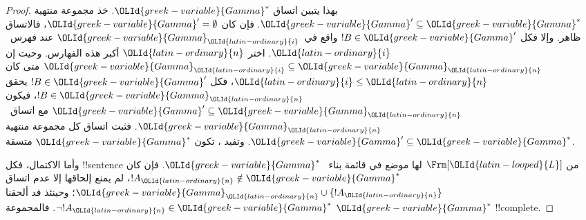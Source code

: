 \documentclass[../../../include/open-logic-section]{subfiles}
\begin{document}
\begin{proof}
بهذا يتبين اتساق ${\OLId{greek-variable}{Gamma}}^*$. خذ مجموعة منتهية
${\OLId{greek-variable}{Gamma}}' \subseteq {\OLId{greek-variable}{Gamma}}^*$. فإن كان ${\OLId{greek-variable}{Gamma}}'=\emptyset$، فالاتساق
ظاهر. وإلا فكل $!B \in {\OLId{greek-variable}{Gamma}}'$ واقع في~${\OLId{greek-variable}{Gamma}}_{\OLId{latin-ordinary}{i}}$ عند فهرس~${\OLId{latin-ordinary}{i}}$.
اختر ${\OLId{latin-ordinary}{n}}$ أكبر هذه الفهارس. وحيث إن
${\OLId{greek-variable}{Gamma}}_{\OLId{latin-ordinary}{i}} \subseteq {\OLId{greek-variable}{Gamma}}_{\OLId{latin-ordinary}{n}}$ متى كان ${\OLId{latin-ordinary}{i}} \le {\OLId{latin-ordinary}{n}}$، فكل
$!B \in {\OLId{greek-variable}{Gamma}}'$ يحقق $!B \in {\OLId{greek-variable}{Gamma}}_{\OLId{latin-ordinary}{n}}$، فيكون
${\OLId{greek-variable}{Gamma}}' \subseteq {\OLId{greek-variable}{Gamma}}_{\OLId{latin-ordinary}{n}}$ مع اتساق~${\OLId{greek-variable}{Gamma}}_{\OLId{latin-ordinary}{n}}$. فثبت اتساق كل
مجموعة منتهية ${\OLId{greek-variable}{Gamma}}' \subseteq {\OLId{greek-variable}{Gamma}}^*$. وتفيد ، تكون ${\OLId{greek-variable}{Gamma}}^*$ متسقة.

وأما الاكتمال، فكل !!{sentence} من $\Frm[{\OLId{latin-looped}{L}}]$ لها موضع في قائمة بناء
~${\OLId{greek-variable}{Gamma}}^*$. فإن كان $!A_{\OLId{latin-ordinary}{n}} \notin {\OLId{greek-variable}{Gamma}}^*$، لم يمنع إلحاقها إلا
عدم اتساق ${\OLId{greek-variable}{Gamma}}_{\OLId{latin-ordinary}{n}} \cup \{!A_{\OLId{latin-ordinary}{n}}\}$؛ وحينئذ قد ألحقنا
$\lnot !A_{\OLId{latin-ordinary}{n}} \in {\OLId{greek-variable}{Gamma}}^*$. فالمجموعة ${\OLId{greek-variable}{Gamma}}^*$ !!{complete}.
\end{proof}
\end{document}

